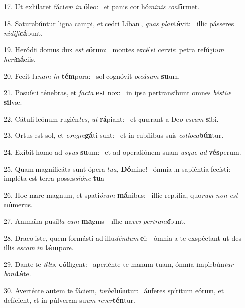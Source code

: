 17. Ut exhílaret fáci\textit{em} \textit{in} \textbf{ó}leo: \ast\  et panis cor hó\textit{mi}\textit{nis} \textit{con}\textbf{fír}met.\

18. Saturabúntur ligna campi, et cedri Líbani, \textit{quas} \textit{plan}\textbf{tá}vit: \ast\  illic pásseres \textit{ni}\textit{di}\textit{fi}\textbf{cá}bunt.\

19. Heródii domus dux \textit{est} \textit{e}\textbf{ó}rum: \ast\  montes excélsi cervis: petra refúgi\textit{um} \textit{he}\textit{ri}\textbf{ná}ciis.\

20. Fecit lu\textit{nam} \textit{in} \textbf{tém}pora: \ast\  sol cognóvit \textit{oc}\textit{cá}\textit{sum} \textbf{su}um.\

21. Posuísti ténebras, et \textit{fac}\textit{ta} \textbf{est} nox: \ast\  in ipsa pertransíbunt omnes \textit{bés}\textit{ti}\textit{æ} \textbf{sil}væ.\

22. Cátuli leónum rugién\textit{tes}, \textit{ut} \textbf{rá}piant: \ast\  et quærant a De\textit{o} \textit{es}\textit{cam} \textbf{si}bi.\

23. Ortus est sol, et \textit{con}\textit{gre}\textbf{gá}ti sunt: \ast\  et in cubílibus suis \textit{col}\textit{lo}\textit{ca}\textbf{bún}tur.\

24. Exíbit homo ad \textit{o}\textit{pus} \textbf{su}um: \ast\  et ad operatiónem suam \textit{us}\textit{que} \textit{ad} \textbf{vés}perum.\

25. Quam magnificáta sunt ópera \textit{tu}\textit{a}, \textbf{Dó}mine! \ast\  ómnia in sapiéntia fecísti: impléta est terra posses\textit{si}\textit{ó}\textit{ne} \textbf{tu}a.\

26. Hoc mare magnum, et spati\textit{ó}\textit{sum} \textbf{má}nibus: \ast\  illic reptília, quo\textit{rum} \textit{non} \textit{est} \textbf{nú}merus.\

27. Animália pusíl\textit{la} \textit{cum} \textbf{ma}gnis: \ast\  illic na\textit{ves} \textit{per}\textit{trans}\textbf{í}bunt.\

28. Draco iste, quem formásti ad illu\textit{dén}\textit{dum} \textbf{e}i: \ast\  ómnia a te exspéctant ut des illis \textit{es}\textit{cam} \textit{in} \textbf{tém}pore.\

29. Dante te \textit{il}\textit{lis}, \textbf{cól}ligent: \ast\  aperiénte te manum tuam, ómnia implebún\textit{tur} \textit{bo}\textit{ni}\textbf{tá}te.\

30. Averténte autem te fáciem, \textit{tur}\textit{ba}\textbf{bún}tur: \ast\  áuferes spíritum eórum, et defícient, et in púlverem su\textit{um} \textit{re}\textit{ver}\textbf{tén}tur.\

